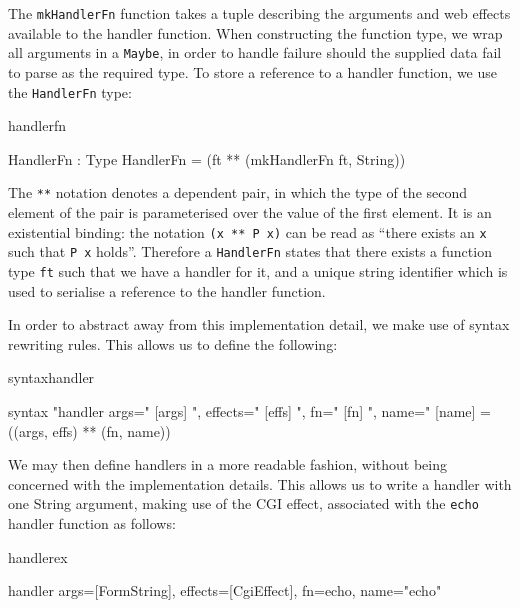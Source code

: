 

\noindent
The \texttt{mkHandlerFn} function takes a tuple describing the arguments and
web effects available to the handler function. When constructing the function
type, we wrap all arguments in a \texttt{Maybe}, in order to handle
failure should the supplied data fail to parse as the required type.
%
To store a reference to a handler function, we use the \texttt{HandlerFn} type:

\begin{SaveVerbatim}{handlerfn}

HandlerFn : Type
HandlerFn = (ft ** (mkHandlerFn ft, String))

\end{SaveVerbatim}

\noindent
The \texttt{**} notation denotes a dependent pair, in which the type of the second
element of the pair is parameterised over the value of the first element. It is
an existential binding:
the notation \texttt{(x ** P x)} can be read as ``there exists an \texttt{x} such that 
\texttt{P x} holds''.
Therefore a \texttt{HandlerFn} states that there exists a function type
\texttt{ft} such that we have a handler for it, and a unique string identifier
which is used to serialise a
reference to the handler function. 

In order to abstract away from this implementation detail, we make use of
\idris{} syntax rewriting rules. This allows us to define the following:

\noindent
\begin{SaveVerbatim}{syntaxhandler}

syntax 
  "handler args=" [args] ", effects=" [effs] ", fn=" [fn] 
  ", name=" [name] = ((args, effs) ** (fn, name))

\end{SaveVerbatim}

\noindent
We may then define handlers in a more readable fashion, without being
concerned with the implementation details. This allows us to write a handler
with one String argument, making use of the CGI effect, associated with the
\texttt{echo} handler function as follows:

\begin{SaveVerbatim}{handlerex}

handler args=[FormString], 
        effects=[CgiEffect], 
        fn=echo, 
        name="echo"

\end{SaveVerbatim}

